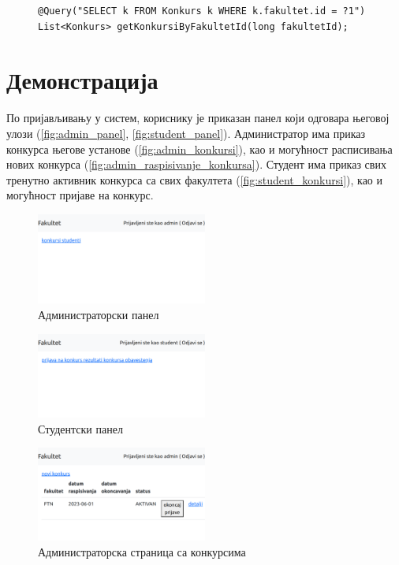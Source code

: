 \documentclass[a4paper]{article}
\begin{document}
\begin{figure}[H]
\begin{lstlisting}[caption={Пример Repository методе},label={lst:repository},captionpos=b]
@Query("SELECT k FROM Konkurs k WHERE k.fakultet.id = ?1")
List<Konkurs> getKonkursiByFakultetId(long fakultetId);
\end{lstlisting}
\end{figure}

\section*{Демонстрација}

По пријављивању у систем, кориснику је приказан панел који одговара његовој улози (\autoref{fig:admin_panel}, \autoref{fig:student_panel}). 
Администратор има приказ конкурса његове установе (\autoref{fig:admin_konkursi}), као и могућност
расписивања нових конкурса (\autoref{fig:admin_raspisivanje_konkursa}).
Студент има приказ свих тренутно активник конкурса са свих факултета (\autoref{fig:student_konkursi}), као и могућност пријаве на конкурс.

\begin{figure}[H]
    \centering
    \includegraphics[width=0.5\textwidth,keepaspectratio]{images/admin_panel.png}
    \caption{Администраторски панел}
    \label{fig:admin_panel}
\end{figure}

\begin{figure}[H]
    \centering
    \includegraphics[width=0.5\textwidth,keepaspectratio]{images/student_panel.png}
    \caption{Студентски панел}
    \label{fig:student_panel}
\end{figure}

\begin{figure}[H]
    \centering
    \includegraphics[width=0.5\textwidth,keepaspectratio]{images/admin_konkursi.png}
    \caption{Администраторска страница са конкурсима}
    \label{fig:admin_konkursi}
\end{figure}
\end{document}
